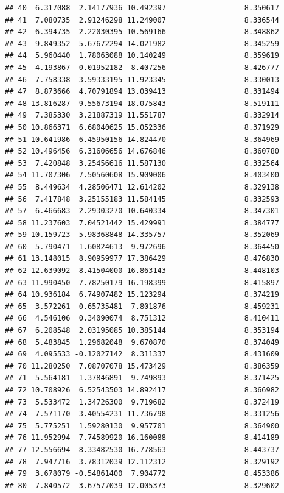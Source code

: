 \documentclass[
]{article}
\begin{document}
\begin{verbatim}
## 40  6.317088  2.14177936 10.492397                  8.350617
## 41  7.080735  2.91246298 11.249007                  8.336544
## 42  6.394735  2.22030395 10.569166                  8.348862
## 43  9.849352  5.67672294 14.021982                  8.345259
## 44  5.960440  1.78063088 10.140249                  8.359619
## 45  4.193867 -0.01952182  8.407256                  8.426777
## 46  7.758338  3.59333195 11.923345                  8.330013
## 47  8.873666  4.70791894 13.039413                  8.331494
## 48 13.816287  9.55673194 18.075843                  8.519111
## 49  7.385330  3.21887319 11.551787                  8.332914
## 50 10.866371  6.68040625 15.052336                  8.371929
## 51 10.641986  6.45950156 14.824470                  8.364969
## 52 10.496456  6.31606656 14.676846                  8.360780
## 53  7.420848  3.25456616 11.587130                  8.332564
## 54 11.707306  7.50560608 15.909006                  8.403400
## 55  8.449634  4.28506471 12.614202                  8.329138
## 56  7.417848  3.25155183 11.584145                  8.332593
## 57  6.466683  2.29303270 10.640334                  8.347301
## 58 11.237603  7.04521442 15.429991                  8.384777
## 59 10.159723  5.98368848 14.335757                  8.352069
## 60  5.790471  1.60824613  9.972696                  8.364450
## 61 13.148015  8.90959977 17.386429                  8.476830
## 62 12.639092  8.41504000 16.863143                  8.448103
## 63 11.990450  7.78250179 16.198399                  8.415897
## 64 10.936184  6.74907482 15.123294                  8.374219
## 65  3.572261 -0.65735481  7.801876                  8.459231
## 66  4.546106  0.34090074  8.751312                  8.410411
## 67  6.208548  2.03195085 10.385144                  8.353194
## 68  5.483845  1.29682048  9.670870                  8.374049
## 69  4.095533 -0.12027142  8.311337                  8.431609
## 70 11.280250  7.08707078 15.473429                  8.386359
## 71  5.564181  1.37846891  9.749893                  8.371425
## 72 10.708926  6.52543503 14.892417                  8.366982
## 73  5.533472  1.34726300  9.719682                  8.372419
## 74  7.571170  3.40554231 11.736798                  8.331256
## 75  5.775251  1.59280130  9.957701                  8.364900
## 76 11.952994  7.74589920 16.160088                  8.414189
## 77 12.556694  8.33482530 16.778563                  8.443737
## 78  7.947716  3.78312039 12.112312                  8.329192
## 79  3.678079 -0.54861400  7.904772                  8.453386
## 80  7.840572  3.67577039 12.005373                  8.329602

\end{verbatim}
\end{document}
